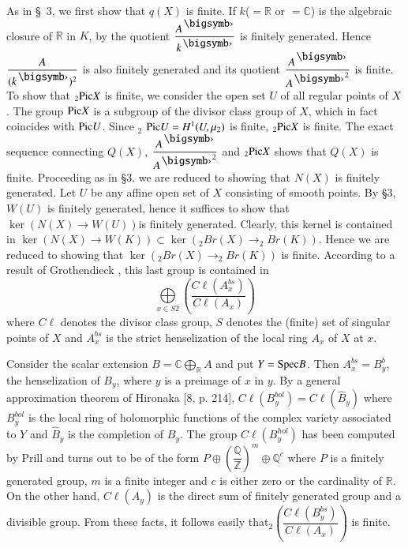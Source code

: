 As in \S\ 3, we first show that $q(X)$ is finite. If $k$($=\mathbb{R}$ or $=\mathbb{C}$) is the algebraic closure of $\mathbb{R}$ in $K$, by \cite{key15} the quotient $\dfrac{A^{\bigdot}}{k^{\bigdot}}$ is finitely generated. Hence $\dfrac{A}{(k^{\bigdot})^{2}}$ is also finitely generated and its quotient $\dfrac{A^{\bigdot}}{{A^{\bigdot}}^{2}}$ is finite. To show that $_2\mathrm{Pic} X$ is finite, we consider the open set $U$ of all regular points of $X$. The group $\mathrm{Pic} X$ is a subgroup of the divisor class group of $X$, which in fact coincides with $\mathrm{Pic} U$. Since $_2$ $\mathrm{Pic} U=H^{1}(U,\mu_2)$ is finite, $_2\mathrm{Pic} X$ is finite. The exact sequence connecting $Q(X)$, $\dfrac{A^{\bigdot}}{{A^{\bigdot}}^{2}}$ and $_2 \mathrm{Pic} X$ shows that $Q(X)$ is finite. Proceeding as in \S $3$. we are reduced to showing that $N(X)$ is finitely generated. Let $U$ be any affine open set of $X$ consisting of smooth points. By \S $3$, $W(U)$ is finitely generated, hence it suffices to show that $\ker(N(X)\to W(U))$\pageoriginale is finitely generated. Clearly, this kernel is contained in $\ker(N(X)\to W(K))\subset\ker(_2Br(X)\to_2 Br(K))$. Hence we are reduced to showing that $\ker(_2Br(X)\to_2Br(K))$ is finite. According to a result of Grothendieck \cite[p.74]{key7}, this last group is contained in 
$$
\bigoplus\limits_{x\in S 2}\left(\dfrac{C\ell\left(A^{bs}_x\right)}{C\ell(A_x)}\right)
$$
where $C\ell$ denotes the divisor class group, $S$ denotes the (finite) set of singular points of $X$ and $A^{bs}_x$ is the strict henselization of the local ring $A_x$ of $X$ at $x$. 

Consider the scalar extension $B=\mathbb{C}\bigoplus\limits_{\mathbb{R}}A$ and put $Y=\mathrm{Spec} B$. Then $A^{bs}_x=B^{b}_y$, the henselization of $B_y$, where $y$ is a preimage of $x$ in $y$. By a general approximation theorem of Hironaka [8, p. 214], $C\ell \left(B^{bol}_y\right)=C\ell\left(\widehat{B}_y\right)$ where $B^{bol}_y$ is the local ring of holomorphic functions of the complex variety associated to $Y$ and $\widehat{B}_y$ is the completion of $B_y$. The group $C\ell\left(B^{hol}_y\right)$ has been computed by Prill \cite{key14} and turns out to be of the form $P\oplus \left(\dfrac{\mathbb{Q}}{\mathbb{Z}}\right)^{m}\oplus \mathbb{Q}^c$ where $P$ is a finitely generated group, $m$ is a finite integer and $c$ is either zero or the cardinality of $\mathbb{R}$. On the other hand, $C\ell(A_y)$ is the direct sum of finitely generated group and a divisible group. From these facts, it follows easily that$_2\left(\dfrac{C\ell\left(B^{bs}_y\right)}{C\ell(A_x)}\right)$ is finite. 

